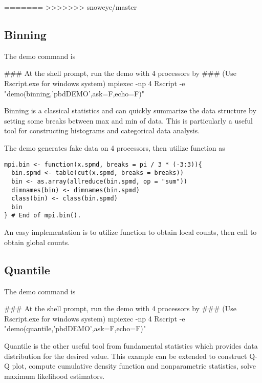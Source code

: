 =======
>>>>>>> snoweye/master



\subsection[Binning]{Binning}
\label{sec:binning}

The demo command is
\begin{Command}
### At the shell prompt, run the demo with 4 processors by
### (Use Rscript.exe for windows system)
mpiexec -np 4 Rscript -e "demo(binning,'pbdDEMO',ask=F,echo=F)"
\end{Command}

Binning is a classical statistics and can quickly summarize
the data structure by setting some breaks between max and min of data.
This is particularly a useful tool for constructing histograms and
categorical data analysis.

The demo  generates fake data on 4 processors, then
utilize  function as
\begin{lstlisting}[language=rr,title=R Code]
mpi.bin <- function(x.spmd, breaks = pi / 3 * (-3:3)){
  bin.spmd <- table(cut(x.spmd, breaks = breaks))
  bin <- as.array(allreduce(bin.spmd, op = "sum"))
  dimnames(bin) <- dimnames(bin.spmd)
  class(bin) <- class(bin.spmd)
  bin
} # End of mpi.bin().
\end{lstlisting}
An easy implementation is to utilize  function to obtain
local counts, then call  to obtain global counts.



\subsection[Quantile]{Quantile}
\label{sec:quantile}

The demo command is
\begin{Command}
### At the shell prompt, run the demo with 4 processors by
### (Use Rscript.exe for windows system)
mpiexec -np 4 Rscript -e "demo(quantile,'pbdDEMO',ask=F,echo=F)"
\end{Command}

Quantile is the other useful tool from fundamental statistics
which provides data distribution for the desired value.
This example can be extended to construct Q-Q plot,
compute cumulative density function and nonparametric statistics,
solve maximum likelihood estimators.

